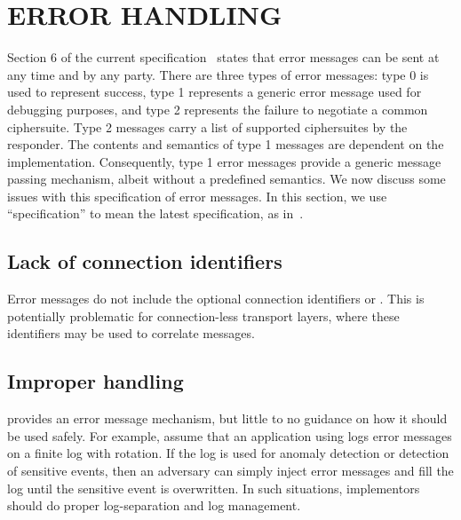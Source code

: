 \documentclass[runningheads]{llncs}
\begin{document}
\section{\uppercase{Error handling}}
\label{sec:errorHandling}
Section 6 of the current \mEdhoc{} 
specification~\cite{draft-ietf-lake-edhoc-15} 
states that error messages can be sent at any time and by any party.
%
There are three types of error messages: type 0 is used to represent success, 
type 1 represents a generic error message used for debugging purposes, and 
type 2 represents the failure to negotiate a common ciphersuite. 
%
Type 2 messages carry a list of supported ciphersuites by the responder.
%
The contents and semantics of type 1 messages are dependent on the 
implementation.
%
Consequently, type 1 error messages provide a generic message passing 
mechanism, albeit without a predefined semantics.
%
We now discuss some issues with this specification of error messages.
%
In this section, we use ``specification'' to mean the latest specification, as 
in~\cite{draft-ietf-lake-edhoc-15}.

\subsection{Lack of connection identifiers}
Error messages do not include the optional connection identifiers \mCi{} or 
\mCr{}.
%
This is potentially problematic for connection-less transport layers, where 
these identifiers may be used to correlate messages.

\subsection{Improper handling}
\mEdhoc{} provides an error message mechanism, but little to no guidance on 
how it should be used safely.
%
For example, assume that an application using \mEdhoc{} logs error messages 
on a finite log with rotation.
%
If the log is used for anomaly detection or detection of sensitive events, then 
an adversary can simply inject error messages and fill the log until the 
sensitive event is overwritten.
%
In such situations, implementors should do proper log-separation and log 
management.
\end{document}
